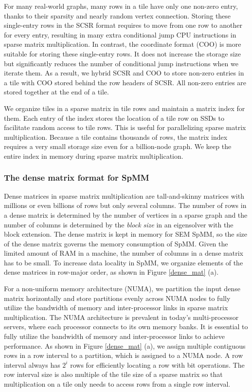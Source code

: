 For many real-world graphs, many rows in a tile have only one non-zero entry,
thanks to their sparsity and nearly random vertex connection. Storing these
single-entry rows in the SCSR format requires to move from one row to another
for every entry, resulting in many extra conditional jump CPU instructions
in sparse matrix multiplication.
In contrast, the coordinate format (COO) is more suitable for storing these
single-entry rows. It does not increase the storage size but significantly
reduces the number of conditional jump instructions when we iterate
them. As a result, we hybrid SCSR and COO to store non-zero entries in a tile
with COO stored behind the row headers of SCSR. All non-zero entries are
stored together at the end of a tile.

We organize tiles in a sparse matrix in tile rows and maintain a matrix index
for them. Each entry of the index stores the location of a tile row on SSDs
to facilitate random access
to tile rows. This is useful for parallelizing sparse matrix multiplication.
Because a tile contains thousands of rows, the matrix index requires a very
small storage size even for a billion-node graph. We keep the entire index
in memory during sparse matrix multiplication.

\subsubsection{The dense matrix format for SpMM} \label{numa_mat}
Dense matrices in sparse matrix multiplication are tall-and-skinny matrices
with millions or even billions of rows but only several columns. The number
of rows in a dense matrix is determined by the number of vertices in a sparse
graph and the number of columns is determined by the \textit{block size}
in an eigensolver with the block extension. The dense matrix is kept in memory
for SEM SpMM, so the size of the dense matrix governs the memory consumption
of SpMM. Given the limited amount of RAM in a machine, the number of columns
in a dense matrix has to be small. To increase data locality in SpMM, we organize
elements of the dense matrices in row-major order, as shown in Figure
\ref{dense_mat} (a).

For a non-uniform memory architecture (NUMA), we partition the input dense matrix
horizontally and store partitions evenly across NUMA nodes to fully utilize
the bandwidth of memory and inter-processor links in sparse matrix
multiplication. The NUMA architecture is prevalent in today's multi-processor
servers, where each processor connects to its own memory banks. It is essential
to fully utilize the bandwidth of memory and inter-processor links to achieve
performance. As shown in Figure \ref{dense_mat} (a), we assign multiple
contiguous rows in a row interval to a partition, which is assigned to a NUMA
node. A row interval always has $2^i$ rows for efficiently locating a row
with bit operations. The row interval size is also multiple of the tile size of
a sparse matrix so that multiplication on a tile only needs to access rows
from a single row interval.

